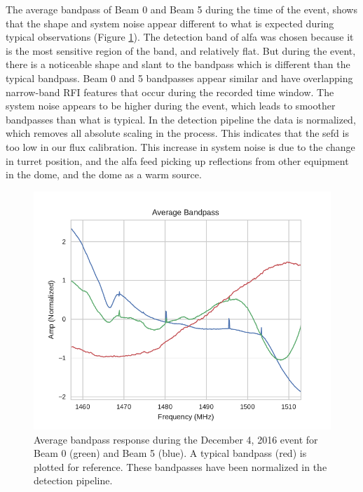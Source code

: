 \documentclass[a4paper,fleqn,usenatbib]{mnras}
\begin{document}
The average bandpass of Beam 0 and Beam 5 during the time of the event, shows
that the shape and system noise appear different to what is expected during
typical observations (Figure \ref{fig:bandpass_response}).  The detection band
of \gls{alfa} was chosen because it is the most sensitive region of the band,
and relatively flat. But during the event, there is a noticeable shape and slant
to the bandpass which is different than the typical bandpass.  Beam 0 and 5
bandpasses appear similar and have overlapping narrow-band RFI features that
occur during the recorded time window.  The system noise appears to be higher
during the event, which leads to smoother bandpasses than what is typical.  In
the detection pipeline the data is normalized, which removes all absolute
scaling in the process. This indicates that the \gls{sefd} is too low in our
flux calibration. This increase in system noise is due to the change in turret
position, and the \gls{alfa} feed picking up reflections from other equipment in
the dome, and the dome as a warm source.

\begin{figure}
    \includegraphics[width=1.0\linewidth]{figures/bandpass_response.pdf}
    \caption{Average bandpass response during the December 4, 2016 event for
    Beam 0 (green) and Beam 5 (blue). A typical bandpass (red) is plotted for
    reference. These bandpasses have been normalized in the detection pipeline.
    }
    \label{fig:bandpass_response}
\end{figure}
\end{document}
